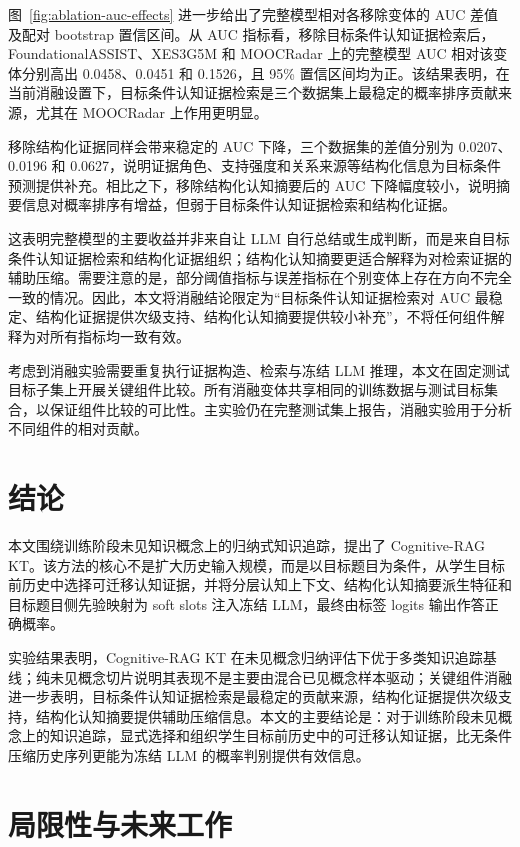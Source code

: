 \documentclass[UTF8,a4paper,12pt]{ctexart}
\numberwithin{table}{section}
\begin{document}
图~\ref{fig:ablation-auc-effects} 进一步给出了完整模型相对各移除变体的 AUC 差值及配对 bootstrap 置信区间。从 AUC 指标看，移除目标条件认知证据检索后，FoundationalASSIST、XES3G5M 和 MOOCRadar 上的完整模型 AUC 相对该变体分别高出 0.0458、0.0451 和 0.1526，且 95\% 置信区间均为正。该结果表明，在当前消融设置下，目标条件认知证据检索是三个数据集上最稳定的概率排序贡献来源，尤其在 MOOCRadar 上作用更明显。

移除结构化证据同样会带来稳定的 AUC 下降，三个数据集的差值分别为 0.0207、0.0196 和 0.0627，说明证据角色、支持强度和关系来源等结构化信息为目标条件预测提供补充。相比之下，移除结构化认知摘要后的 AUC 下降幅度较小，说明摘要信息对概率排序有增益，但弱于目标条件认知证据检索和结构化证据。

这表明完整模型的主要收益并非来自让 LLM 自行总结或生成判断，而是来自目标条件认知证据检索和结构化证据组织；结构化认知摘要更适合解释为对检索证据的辅助压缩。需要注意的是，部分阈值指标与误差指标在个别变体上存在方向不完全一致的情况。因此，本文将消融结论限定为“目标条件认知证据检索对 AUC 最稳定、结构化证据提供次级支持、结构化认知摘要提供较小补充”，不将任何组件解释为对所有指标均一致有效。

考虑到消融实验需要重复执行证据构造、检索与冻结 LLM 推理，本文在固定测试目标子集上开展关键组件比较。所有消融变体共享相同的训练数据与测试目标集合，以保证组件比较的可比性。主实验仍在完整测试集上报告，消融实验用于分析不同组件的相对贡献。


\section{结论}

本文围绕训练阶段未见知识概念上的归纳式知识追踪，提出了 Cognitive-RAG KT。该方法的核心不是扩大历史输入规模，而是以目标题目为条件，从学生目标前历史中选择可迁移认知证据，并将分层认知上下文、结构化认知摘要派生特征和目标题目侧先验映射为 soft slots 注入冻结 LLM，最终由标签 logits 输出作答正确概率。

实验结果表明，Cognitive-RAG KT 在未见概念归纳评估下优于多类知识追踪基线；纯未见概念切片说明其表现不是主要由混合已见概念样本驱动；关键组件消融进一步表明，目标条件认知证据检索是最稳定的贡献来源，结构化证据提供次级支持，结构化认知摘要提供辅助压缩信息。本文的主要结论是：对于训练阶段未见概念上的知识追踪，显式选择和组织学生目标前历史中的可迁移认知证据，比无条件压缩历史序列更能为冻结 LLM 的概率判别提供有效信息。

\section{局限性与未来工作}
\end{document}
